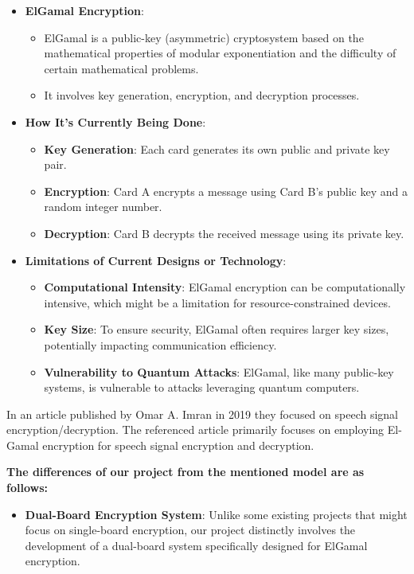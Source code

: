 \documentclass[12pt]{article}
\begin{document}
	\begin{itemize}
		\item \textbf{ElGamal Encryption}:
		\begin{itemize}
			\item ElGamal is a public-key (asymmetric) cryptosystem based on the mathematical properties of modular exponentiation and the difficulty of certain mathematical problems.
			\item It involves key generation, encryption, and decryption processes.
		\end{itemize}
		
		\item \textbf{How It's Currently Being Done}:
		\begin{itemize}
			\item \textbf{Key Generation}: Each card generates its own public and private key pair.
			\item \textbf{Encryption}: Card A encrypts a message using Card B's public key and a random integer number.
			\item \textbf{Decryption}: Card B decrypts the received message using its private key.
		\end{itemize}
		
		\item \textbf{Limitations of Current Designs or Technology}:
		\begin{itemize}
			\item \textbf{Computational Intensity}: ElGamal encryption can be computationally intensive, which might be a limitation for resource-constrained devices.
			\item \textbf{Key Size}: To ensure security, ElGamal often requires larger key sizes, potentially impacting communication efficiency.
			\item \textbf{Vulnerability to Quantum Attacks}: ElGamal, like many public-key systems, is vulnerable to attacks leveraging quantum computers.
		\end{itemize}
	\end{itemize}
		
		
		In an article published by Omar A. Imran in 2019\cite{IMRAN20201028} they focused on speech signal encryption/decryption.	The referenced article primarily focuses on employing El-Gamal encryption for speech signal encryption and decryption. 
		 
	 \textbf{The differences of our project from the mentioned model are as follows:}
	 \begin{itemize}
	 	\item \textbf{Dual-Board Encryption System}: Unlike some existing projects that might focus on single-board encryption, our project distinctly involves the development of a dual-board system specifically designed for ElGamal encryption.
	 \end{itemize}
	 
\end{document}
